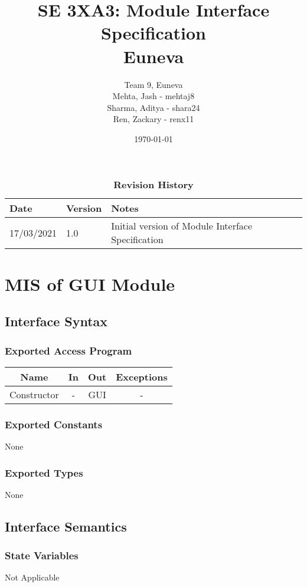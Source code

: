 \documentclass[12pt, titlepage]{article}
\title{SE 3XA3: Module Interface Specification\\Euneva}
\author{Team 9, Euneva
		\\ Mehta, Jash - mehtaj8
		\\ Sharma, Aditya - shara24
		\\ Ren, Zackary - renx11
}
\date{\today}
\begin{document}
\maketitle

\tableofcontents
\listoftables
\listoffigures

\begin{table}[bp]
\caption{\bf Revision History}
\begin{tabularx}{\textwidth}{p{3cm}p{2cm}X}
\toprule {\bf Date} & {\bf Version} & {\bf Notes}\\
\midrule
17/03/2021 & 1.0 & Initial version of Module Interface Specification\\
\bottomrule
\end{tabularx}
\end{table}

\newpage


\section{MIS of GUI Module}
\subsection{Interface Syntax}
\subsubsection{Exported Access Program}
\begin{tabular}[pos]{|c|c|c|c|}
    \hline
    \textbf{Name}& \textbf{In} & \textbf{Out} & \textbf{Exceptions} \\ \hline
    Constructor & - & GUI & -\\ \hline
\end{tabular}
\subsubsection{Exported Constants}
None
\subsubsection{Exported Types}
None
\subsection{Interface Semantics}
\subsubsection{State Variables}
Not Applicable
\end{document}
